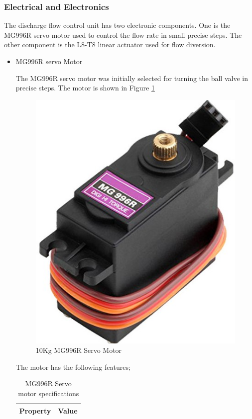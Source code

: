 \subsubsection{Electrical and Electronics}
The discharge flow control unit has two electronic components. One is the MG996R servo motor used to control the flow rate in small precise steps. The other component is the L8-T8 linear actuator used for flow diversion.
\begin{itemize}
    \item MG996R servo Motor
\par
The MG996R servo motor was initially selected for turning the ball valve in precise steps. The motor is shown in  Figure \ref{fig: 10Kg MG996R Servo Motor}
  \begin{figure}[H]
        \centering
        \includegraphics [height=.3\textheight] {Figures/MG996R.jpg}
        \caption{10Kg MG996R Servo Motor}
        \label{fig: 10Kg MG996R Servo Motor}
        \end{figure}
The motor has the following features;
\begin{table}[H]
\centering
\caption[MG996R Servo motor specifications]{MG996R Servo motor specifications \cite{mg996r}}
\begin{tabular}{|l|l|}
\hline
\textbf{Property} & \textbf{Value} \\ \hline

\end{tabular}
\end{table}
\end{itemize}
